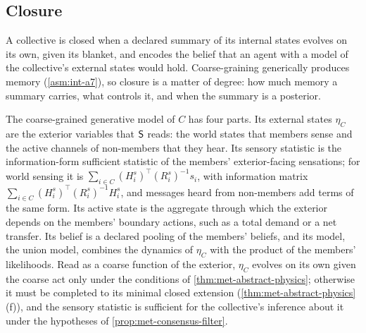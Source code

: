 \subsection{Closure}\label{sec:agy-closure}

A collective is closed when a declared summary of its internal states evolves on its own, given its blanket, and encodes the belief that an agent with a model of the collective's external states would hold. Coarse-graining generically produces memory (\cref{asm:int-a7}), so closure is a matter of degree: how much memory a summary carries, what controls it, and when the summary is a posterior.

The coarse-grained generative model of $C$ has four parts. Its external states $\eta_C$ are the exterior variables that $\mathsf{S}$ reads: the world states that members sense and the active channels of non-members that they hear. Its sensory statistic is the information-form sufficient statistic of the members' exterior-facing sensations; for world sensing it is $\sum_{i\in C}(H^s_i)^\top(R^s_i)^{-1}s_i$, with information matrix $\sum_{i\in C}(H^s_i)^\top(R^s_i)^{-1}H^s_i$, and messages heard from non-members add terms of the same form. Its active state is the aggregate through which the exterior depends on the members' boundary actions, such as a total demand or a net transfer. Its belief is a declared pooling of the members' beliefs, and its model, the union model, combines the dynamics of $\eta_C$ with the product of the members' likelihoods. Read as a coarse function of the exterior, $\eta_C$ evolves on its own given the coarse act only under the conditions of \cref{thm:met-abstract-physics}; otherwise it must be completed to its minimal closed extension (\cref{thm:met-abstract-physics}(f)), and the sensory statistic is sufficient for the collective's inference about it under the hypotheses of \cref{prop:met-consensus-filter}.

